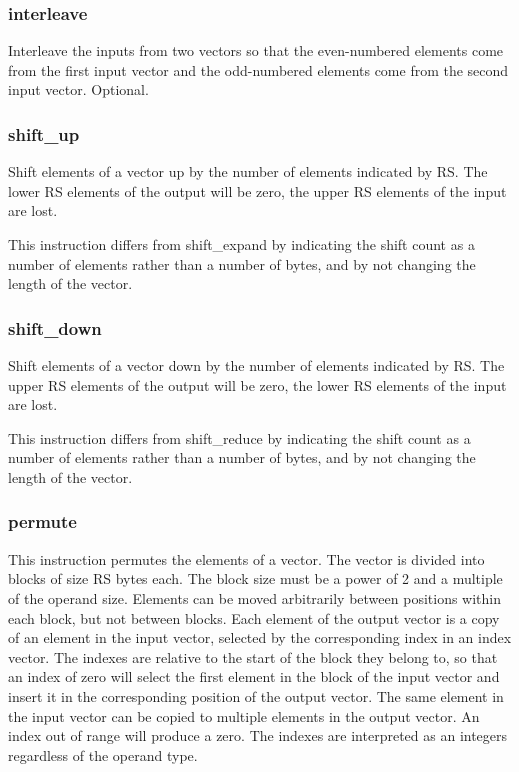 \documentclass[forwardcom.tex]{subfiles}
\begin{document}
\subsubsection{interleave}
Interleave the inputs from two vectors so that the even-numbered elements come from the first input vector and the odd-numbered elements come from the second input vector. Optional.

\subsubsection{shift\_up}
Shift elements of a vector up by the number of elements indicated by RS. The lower RS elements of the output will be zero, the upper RS elements of the input are lost.
\vspace{2mm}

This instruction differs from shift\_expand by indicating the shift count as a number of elements rather than a number of bytes, and by not changing the length of the vector.

\subsubsection{shift\_down}
Shift elements of a vector down by the number of elements indicated by RS. The upper RS elements of the output will be zero, the lower RS elements of the input are lost.
\vspace{2mm}

This instruction differs from shift\_reduce by indicating the shift count as a number of elements rather than a number of bytes, and by not changing the length of the vector.

\subsubsection{permute}
This instruction permutes the elements of a vector. The vector is divided into blocks of size RS bytes each. The block size must be a power of 2 and a multiple of the operand size. Elements can be moved arbitrarily between positions within each block, but not between blocks. Each element of the output vector is a copy of an element in the input vector, selected by the corresponding index in an index vector. The indexes are relative to the start of the block they belong to, so that an index of zero will select the first element in the block of the input vector and insert it in the corresponding position of the output vector. The same element in the input vector can be copied to multiple elements in the output vector. An index out of range will produce a zero. The indexes are interpreted as an integers regardless of the operand type.
\vspace{2mm}
\end{document}
